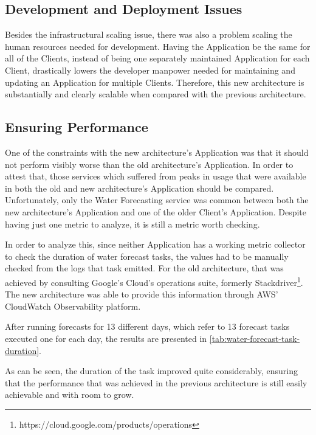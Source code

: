 \subsection{Development and Deployment Issues}\label{results-and-discussion:ss:development-and-deployment-issues}

Besides the infrastructural scaling issue, there was also a problem scaling the human resources needed for development. Having the Application be the same for all of the Clients, instead of being one separately maintained Application for each Client, drastically lowers the developer manpower needed for maintaining and updating an Application for multiple Clients. Therefore, this new architecture is substantially and clearly scalable when compared with the previous architecture.

\subsection{Ensuring Performance}\label{results-and-discussion:ss:ensuring-performance}

One of the constraints with the new architecture's Application was that it should not perform visibly worse than the old architecture's Application. In order to attest that, those services which suffered from peaks in usage that were available in both the old and new architecture's Application should be compared. Unfortunately, only the Water Forecasting service was common between both the new architecture's Application and one of the older Client's Application. Despite having just one metric to analyze, it is still a metric worth checking.

In order to analyze this, since neither Application has a working metric collector to check the duration of water forecast tasks, the values had to be manually checked from the logs that task emitted. For the old architecture, that was achieved by consulting Google's Cloud's operations suite, formerly Stackdriver\footnote{https://cloud.google.com/products/operations\label{foot:stackdriver}}. The new architecture was able to provide this information through AWS' CloudWatch Observability platform.



After running forecasts for 13 different days, which refer to 13 forecast tasks executed one for each day, the results are presented in \cref{tab:water-forecast-task-duration}.

As can be seen, the duration of the task improved quite considerably, ensuring that the performance that was achieved in the previous architecture is still easily achievable and with room to grow.







